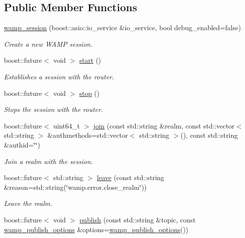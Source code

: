 \subsection*{Public Member Functions}
\begin{DoxyCompactItemize}
\item 
\hyperlink{classautobahn_1_1wamp__session_a0693ad91bf2fe2952044979ad6d32ec4}{wamp\+\_\+session} (boost\+::asio\+::io\+\_\+service \&io\+\_\+service, bool debug\+\_\+enabled=false)
\begin{DoxyCompactList}\small\item\em Create a new W\+A\+MP session. \end{DoxyCompactList}\item 
boost\+::future$<$ void $>$ \hyperlink{classautobahn_1_1wamp__session_a50e587da630e209858a70ae342ee1fec}{start} ()
\begin{DoxyCompactList}\small\item\em Establishes a session with the router. \end{DoxyCompactList}\item 
boost\+::future$<$ void $>$ \hyperlink{classautobahn_1_1wamp__session_a735e96fa6dd856a0ffb03161ff1ca262}{stop} ()
\begin{DoxyCompactList}\small\item\em Stops the session with the router. \end{DoxyCompactList}\item 
boost\+::future$<$ uint64\+\_\+t $>$ \hyperlink{classautobahn_1_1wamp__session_aec0bc6ef02837fa3daaba07d9f053368}{join} (const std\+::string \&realm, const std\+::vector$<$ std\+::string $>$ \&authmethods=std\+::vector$<$ std\+::string $>$(), const std\+::string \&authid=\char`\"{}\char`\"{})
\begin{DoxyCompactList}\small\item\em Join a realm with the session. \end{DoxyCompactList}\item 
boost\+::future$<$ std\+::string $>$ \hyperlink{classautobahn_1_1wamp__session_a499c1a7f1e7c3a9da71cc1ec82521dfa}{leave} (const std\+::string \&reason=std\+::string(\char`\"{}wamp.\+error.\+close\+\_\+realm\char`\"{}))
\begin{DoxyCompactList}\small\item\em Leave the realm. \end{DoxyCompactList}\item 
boost\+::future$<$ void $>$ \hyperlink{group___p_u_b_ga404fcf00db6996043d66a36c38fbd9e7}{publish} (const std\+::string \&topic, const \hyperlink{classautobahn_1_1wamp__publish__options}{wamp\+\_\+publish\+\_\+options} \&options=\hyperlink{classautobahn_1_1wamp__publish__options}{wamp\+\_\+publish\+\_\+options}())

\end{DoxyCompactItemize}
